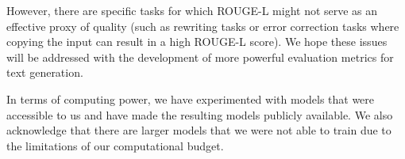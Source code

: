 However, there are specific tasks for which ROUGE-L might not serve as an effective proxy of quality (such as rewriting tasks or error correction tasks where copying the input can result in a high ROUGE-L score). We hope these issues will be addressed with the development of more powerful evaluation metrics for text generation. 

In terms of computing power, we have experimented with models that were accessible to us and have made the resulting models publicly available. We also acknowledge that there are larger models that we were not able to train due to the limitations of our computational budget. 


